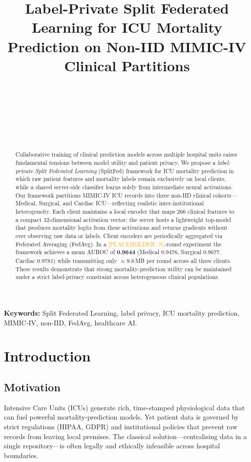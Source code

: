 \documentclass[10pt,twocolumn]{article}
\title{\textbf{Label-Private Split Federated Learning for ICU Mortality
Prediction on Non-IID MIMIC-IV Clinical Partitions}}
\author{
  \placeholder{Author 1} \\
  \placeholder{Institution} \\
  \texttt{\placeholder{email}} \\
  \and
  \placeholder{Author 2} \\
  \placeholder{Institution} \\
  \texttt{\placeholder{email}}
}
\date{\placeholder{Conference / Journal / Preprint -- Month Year}}
\newcommand{\placeholder}[1]{\textcolor{orange}{[PLACEHOLDER: #1]}}
\begin{document}
\maketitle

\begin{abstract}
Collaborative training of clinical prediction models across multiple
hospital units raises fundamental tensions between model utility and
patient privacy.  We propose a \emph{label-private Split Federated
Learning} (SplitFed) framework for ICU mortality prediction in which
raw patient features and mortality labels remain exclusively on local
clients, while a shared server-side classifier learns solely from
intermediate neural activations.  Our framework partitions MIMIC-IV
ICU records into three non-IID clinical cohorts---Medical, Surgical,
and Cardiac ICU---reflecting realistic inter-institutional
heterogeneity.  Each client maintains a local encoder that maps 266
clinical features to a compact 32-dimensional activation vector; the
server hosts a lightweight top-model that produces mortality logits
from these activations and returns gradients without ever observing
raw data or labels.  Client encoders are periodically aggregated via
Federated Averaging (FedAvg).  In a \placeholder{N}-round experiment
the framework achieves a mean AUROC of \textbf{0.9644} (Medical
0.9476, Surgical 0.9677, Cardiac 0.9781) while transmitting only
${\approx}9.8$\,MB per round across all three clients.  These results
demonstrate that strong mortality-prediction utility can be maintained
under a strict label-privacy constraint across heterogeneous clinical
populations.
\end{abstract}

\textbf{Keywords:} Split Federated Learning, label privacy, ICU
mortality prediction, MIMIC-IV, non-IID, FedAvg, healthcare AI.

\section{Introduction}
\label{sec:intro}

\subsection{Motivation}

Intensive Care Units (ICUs) generate rich, time-stamped physiological
data that can fuel powerful mortality-prediction models.  Yet patient
data is governed by strict regulations (HIPAA, GDPR) and institutional
policies that prevent raw records from leaving local premises.  The
classical solution---centralising data in a single repository---is
often legally and ethically infeasible across hospital boundaries.
\end{document}
